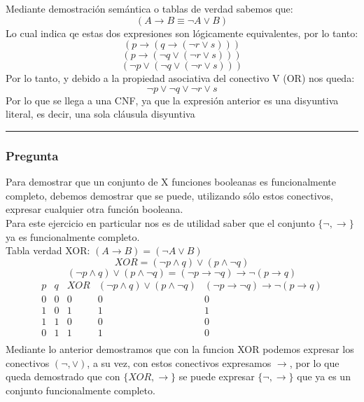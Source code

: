 \documentclass[12pt]{article}
\begin{document}

Mediante demostración semántica o tablas de verdad sabemos que:
\[ (A \rightarrow B \equiv \neg A \lor B )\]
Lo cual indica qe estas dos expresiones son lógicamente equivalentes, por lo tanto:
\[ (p \rightarrow (q \rightarrow (\neg r \lor s)))\] %
\[ (p \rightarrow (\neg q \lor (\neg r \lor s)))\] %
\[ (\neg p \lor (\neg q \lor (\neg r \lor s)))\] %
Por lo tanto, y debido a la propiedad asociativa del conectivo V (OR) nos queda:
\[ \neg p \lor \neg q \lor \neg r \lor s\]
Por lo que se llega a una CNF, ya que la expresión anterior es una disyuntiva literal, es decir,
una sola cláusula disyuntiva

\rule{\linewidth}{0.4pt}



\subsubsection*{Pregunta }

Para demostrar que un conjunto de X funciones booleanas es funcionalmente completo, debemos demostrar
que se puede, utilizando sólo estos conectivos, expresar cualquier otra función booleana.
\\Para este ejercicio en particular nos es de utilidad saber que el conjunto $\{\neg, \rightarrow \}$ ya es funcionalmente completo.
\\ Tabla verdad XOR: $(A \rightarrow B) = (\neg A \lor B)$
\[XOR = (\neg p \land q) \lor (p \land \neg q)\]
\[(\neg p \land q) \lor (p \land \neg q) = (\neg p \rightarrow \neg q) \rightarrow \neg(p \rightarrow q)\]
\[
\begin{array}{c|c|c|c|c}
p & q & XOR & (\neg p \land q) \lor (p \land \neg q) & (\neg p \rightarrow \neg q) \rightarrow \neg(p \rightarrow q)\\ \hline
0 & 0 & 0 & 0 & 0\\
1 & 0 & 1 & 1 & 1\\
1 & 1 & 0 & 0 & 0\\
0 & 1 & 1 & 1 & 0\\
\end{array}
\]
Mediante lo anterior demostramos que con la funcion XOR podemos expresar los conectivos $(\neg, \lor)$,
a su vez, con estos conectivos expresamos $\rightarrow$, por lo que queda demostrado que con $\{XOR, \rightarrow\}$
se puede expresar $\{\neg, \rightarrow\}$ que ya es un conjunto funcionalmente completo.
\end{document}
